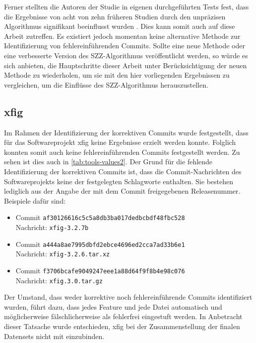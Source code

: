 Ferner stellten die Autoren der Studie in eigenen durchgeführten Tests fest, dass die Ergebnisse von acht von zehn früheren Studien durch den unpräzisen Algorithmus signifikant beeinflusst wurden \cite{Wen2019}. Dies kann somit auch auf diese Arbeit zutreffen. Es existiert jedoch momentan keine alternative Methode zur Identifizierung von fehlereinführenden Commits. Sollte eine neue Methode oder eine verbesserte Version des SZZ-Algorithmus veröffentlicht werden, so würde es sich anbieten, die Hauptschritte dieser Arbeit unter Berücksichtigung der neuen Methode zu wiederholen, um sie mit den hier vorliegenden Ergebnissen zu vergleichen, um die Einflüsse des SZZ-Algorithmus herauszustellen.

\subsection*{xfig}
Im Rahmen der Identifizierung der korrektiven Commits wurde festgestellt, dass für das Softwareprojekt xfig keine Ergebnisse erzielt werden konnte. Folglich konnten somit auch keine fehlereinführenden Commits festgestellt werden. Zu sehen ist dies auch in \autoref{tab:tools-values2}. Der Grund für die fehlende Identifizierung der korrektiven Commits ist, dass die Commit-Nachrichten des Softwareprojekts keine der festgelegten Schlagworte enthalten. Sie bestehen lediglich aus der Angabe der mit dem Commit freigegebenen Releasenummer. Beispiele dafür sind:

\begin{itemize}
\setlength{\itemsep}{-2pt}
\item Commit \texttt{af30126616c5c5a8db3ba017dedbcbdf48fbc528}\\Nachricht: \texttt{xfig-3.2.7b}
\item Commit \texttt{a444a8ae7995dbfd2ebce4696ed2cca7ad33b6e1}\\Nachricht: \texttt{xfig-3.2.6.tar.xz}
\item Commit \texttt{f3706bcafe9049247eee1a88d64f9f8b4e98c076}\\Nachricht: \texttt{xfig.3.0.tar.gz}
\end{itemize}

Der Umstand, dass weder korrektive noch fehlereinführende Commits identifiziert wurden, führt dazu, dass jedes Feature und jede Datei automatisch und möglicherweise fälschlicherweise als \glqq fehlerfrei\grqq{} eingestuft werden. In Anbetracht dieser Tatsache wurde entschieden, xfig bei der Zusammenstellung der finalen Datensets nicht mit einzubinden.

